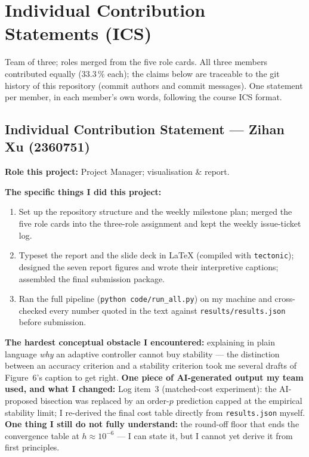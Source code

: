 ﻿\documentclass[11pt,a4paper]{article}
\begin{document}
\appendix
\section{Individual Contribution Statements (ICS)}\label{app:ics}
Team of three; roles merged from the five role cards.  All three members
contributed equally (33.3\,\% each); the claims below are traceable to the
git history of this repository (commit authors and commit messages).  One
statement per member, in each member's own words, following the course ICS
format.

\subsection*{Individual Contribution Statement --- Zihan Xu (2360751)}
\textbf{Role this project:} Project Manager; visualisation \& report.

\textbf{The specific things I did this project:}
\begin{enumerate}[leftmargin=2em,itemsep=1pt]
\item Set up the repository structure and the weekly milestone plan; merged
  the five role cards into the three-role assignment and kept the weekly
  issue-ticket log.
\item Typeset the report and the slide deck in \LaTeX{} (compiled with
  \texttt{tectonic}); designed the seven report figures and wrote their
  interpretive captions; assembled the final submission package.
\item Ran the full pipeline (\texttt{python code/run\_all.py}) on my machine
  and cross-checked every number quoted in the text against
  \texttt{results/results.json} before submission.
\end{enumerate}
\textbf{The hardest conceptual obstacle I encountered:} explaining in plain
language \emph{why} an adaptive controller cannot buy stability --- the
distinction between an accuracy criterion and a stability criterion took me
several drafts of Figure~6's caption to get right.
\textbf{One piece of AI-generated output my team used, and what I changed:}
Log item~3 (matched-cost experiment): the AI-proposed bisection was replaced
by an order-$p$ prediction capped at the empirical stability limit; I
re-derived the final cost table directly from \texttt{results.json} myself.
\textbf{One thing I still do not fully understand:} the round-off floor that
ends the convergence table at $h\approx10^{-6}$ --- I can state it, but I
cannot yet derive it from first principles.
\end{document}
